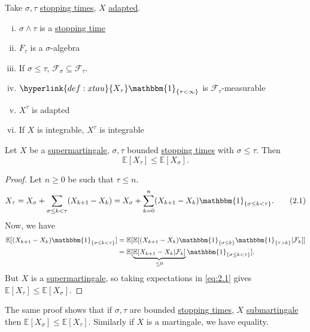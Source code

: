 \documentclass{article}
\newcommand{\F}{\mathcal{F}}
\newcommand{\1}[1]{\mathbbm{1}_{#1}}
\newcommand{\E}{\mathbb{E}}
\begin{document}
\begin{nprop}
  Take $\sigma,\tau$ \hyperlink{def:stopping}{stopping times}, $X$ \hyperlink{def:adapted}{adapted}.
  \begin{enumerate}[(i)]
    \item $\sigma \wedge \tau$ is a \hyperlink{def:stopping}{stopping time}
    \item \hyperlink{def:ftau}{$F_\tau$} is a $\sigma$-algebra
    \item If $\sigma \leq \tau$, $\F_\sigma \subseteq \F_\tau$.
    \item $\hyperlink{def:xtau}{X_\tau} \1{\{\tau < \infty\}}$ is $\F_\tau$-measurable
    \item \hyperlink{def:stoppedprocess}{$X^\tau$} is adapted
    \item If $X$ is integrable, $X^\tau$ is integrable
  \end{enumerate}
\end{nprop}
\begin{nthm}
  Let $X$ be a \hyperlink{def:martingale}{supermartingale}, $\sigma, \tau$ bounded \hyperlink{def:stopping}{stopping times} with $\sigma \leq \tau$. Then
  \begin{equation*}
    \E[X_\tau] \leq \E[X_\sigma]
  .\end{equation*}
\end{nthm}
\begin{proof}
  Let $n \geq 0$ be such that $\tau \leq n$.
  \begin{equation}X_\tau = X_\sigma + \sum_{\sigma \leq k < \tau} (X_{k+1} - X_k) = X_\sigma + \sum_{k=0}^n (X_{k+1} - X_k) \1{\{\sigma \leq k < \tau\}}.\tag{2.1}\label{eq:2.1}\end{equation}
  Now, we have
  \begin{align*}
    \E[(X_{k+1} - X_k) \1{\{\sigma \leq k < \tau\}}] &= \E[\E[(X_{k+1} - X_k) \1{\{\sigma \leq k\}} \1{\{\tau > k\}} | \F_k]] \\
                                                     &= \E[\underbrace{\E[X_{k+1} - X_k | \F_k]}_{\leq 0} \1{\{\sigma \leq k < \tau\}}].
  \end{align*}
  But $X$ is a \hyperlink{def:martingale}{supermartingale}, so taking expectations in \eqref{eq:2.1} gives $\E[X_\tau] \leq \E[X_\sigma]$.
\end{proof}
\begin{remark}
  The same proof shows that if $\sigma,\tau$ are bounded \hyperlink{def:stopping}{stopping times}, $X$ \hyperlink{def:martingale}{submartingale} then $\E[X_\sigma] \leq \E[X_\tau]$.
  Similarly if $X$ is a martingale, we have equality.
\end{remark}
\end{document}
